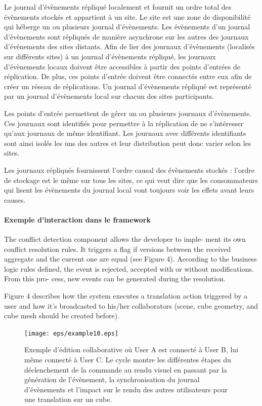 Le journal d'évènements répliqué localement et fournit un ordre total des 
évènements stockés et appartient à un site. 
Le site est une zone de disponibilité qui héberge un ou plusieurs 
journal d'évènements. Les évènements d'un journal d'évènements sont 
répliqués de manière asynchrone sur les autres des journaux d'évènements 
des sites distants. 
Afin de lier des journaux d'évènements (localisés sur différents sites) à un journal 
d'évènements répliqué, les 
journaux d'évènements locaux doivent être accessibles à partir des points 
d'entrées de réplication. De plus, ces points d'entrée doivent être 
connectés entre eux afin de créer un réseau de réplications. 
Un journal d'évènements répliqué est représenté par un journal d'évènements local 
sur chacun des sites participants.


Les points d'entrée permettent de gérer un ou plusieurs journaux d'évènements. 
Ces journaux sont identifiés pour permettre à la réplication de ne s'intéresser 
qu'aux journaux de même identifiant. 
Les journaux avec différents identifiants sont ainsi isolés les uns des autres et 
leur distribution peut donc varier selon les sites.

Les journaux répliqués fournissent l'ordre causal des évènements stockés : l'ordre 
de stockage est le même sur tous les sites, ce qui veut dire que les 
consommateurs qui lisent les évènements du journal local vont toujours voir les 
effets avant leurs causes.



\paragraph{Exemple d'interaction dans le framework}
The conflict detection component allows the developer to imple- ment its own 
conflict resolution rules. It triggers a flag if versions between the received 
aggregate and the current one are equal (see Figure 4). According to the business 
logic rules defined, the event is rejected, accepted with or without modifications. 
From this pro- cess, new events can be generated during the resolution.

Figure 4 describes how the system executes a translation action triggered by a 
user and how it’s broadcasted to his/her collaborators (scene, cube geometry, and 
cube mesh should be created before). 
\begin{figure}[ht]
	\centering
	\texttt{[image: eps/example10.eps]}
	\caption[Flux de la collaboration dans le framework 3DEvent entre 3 
	utilisateurs]{Exemple d'édition collaborative où User A est connecté à User  B, 
	lui 
	même connecté à User C. Le cycle montre les différentes étapes du 
	déclenchement de la commande au rendu visuel en passant par la génération 
	de l'évènement, la 
	synchronisation du journal d'évènements et l'impact sur le rendu des autres 
	utilisateurs pour une translation sur un cube.}\label{fig:cqrs-example}
\end{figure}

